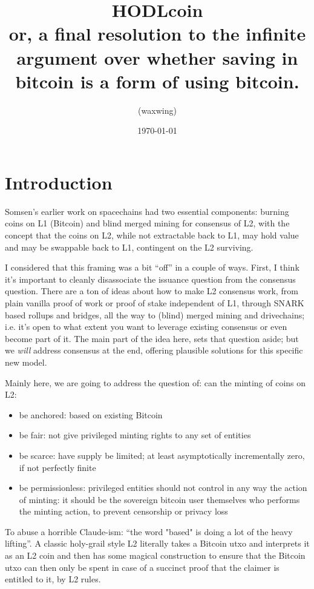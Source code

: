 \documentclass[11pt,a4paper]{article}
\title{\textbf{HODLcoin}\\[0.5em]\large or, a final resolution to the infinite argument over whether saving in bitcoin is a form of using bitcoin.}
\author{(waxwing)}
\date{\today}
\begin{document}
\maketitle

\section{Introduction}

Somsen's earlier work on spacechains had two essential components: burning coins on L1 (Bitcoin) and blind merged mining for consensus of L2, with the concept that the coins on L2, while not extractable back to L1, may hold value and may be swappable back to L1, contingent on the L2 surviving.

I considered that this framing was a bit ``off'' in a couple of ways. First, I think it's important to cleanly disassociate the issuance question from the consensus question. There are a ton of ideas about how to make L2 consensus work, from plain vanilla proof of work or proof of stake independent of L1, through SNARK based rollups and bridges, all the way to (blind) merged mining and drivechains; i.e. it's open to what extent you want to leverage existing consensus or even become part of it. The main part of the idea here, sets that question aside; but we \emph{will} address consensus at the end, offering plausible solutions for this specific new model.

Mainly here, we are going to address the question of: can the minting of coins on L2:

\begin{itemize}
\item be anchored: based on existing Bitcoin
\item be fair: not give privileged minting rights to any set of entities
\item be scarce: have supply be limited; at least asymptotically incrementally zero, if not perfectly finite
\item be permissionless: privileged entities should not control in any way the action of minting: it should be the sovereign bitcoin user themselves who performs the minting action, to prevent censorship or privacy loss
\end{itemize}

To abuse a horrible Claude-ism: ``the word "based" is doing a lot of the heavy lifting''. A classic holy-grail style L2 literally takes a Bitcoin utxo and interprets it as an L2 coin and then has some magical construction to ensure that the Bitcoin utxo can then only be spent in case of a succinct proof that the claimer is entitled to it, by L2 rules.
\end{document}
